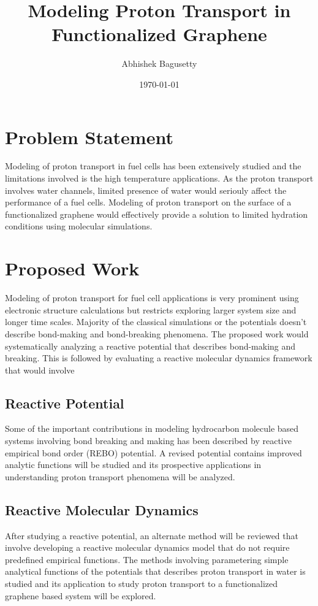\documentclass{article}
\author{Abhishek Bagusetty}
\date{\today}
\title{Modeling Proton Transport in Functionalized Graphene}
\begin{document}
\maketitle

\section{Problem Statement}
\label{sec-1}
Modeling of proton transport in fuel cells has been extensively studied and the limitations involved is the high temperature applications. As the proton transport involves water channels, limited presence of water would seriouly affect the performance of a fuel cells. Modeling of proton transport on the surface of a functionalized graphene would effectively provide a solution to limited hydration conditions using molecular simulations.

\section{Proposed Work}
\label{sec-2}
Modeling of proton transport for fuel cell applications is very prominent using electronic structure calculations but restricts exploring larger system size and longer time scales. Majority of the classical simulations or the potentials doesn't describe bond-making and bond-breaking phenomena. The proposed work would systematically analyzing a reactive potential that describes bond-making and breaking. This is followed by evaluating a reactive molecular dynamics framework that would involve 

\subsection{Reactive Potential}
\label{sec-2-1}
Some of the important contributions in modeling hydrocarbon molecule based systems involving bond breaking and making has been described by reactive empirical bond order (REBO) potential. A revised potential contains improved analytic functions will be studied \cite{brenner-2002-rebo} and its prospective applications in understanding proton transport phenomena will be analyzed. 

\subsection{Reactive Molecular Dynamics}
\label{sec-2-2}
After studying a reactive potential, an alternate method \cite{knight-2012-multis} will be reviewed that involve developing a reactive molecular dynamics model that do not require predefined empirical functions. The methods involving parametering simple analytical functions of the potentials that describes proton transport in water is studied and its application to study proton transport to a functionalized graphene based system will be explored.
\end{document}
